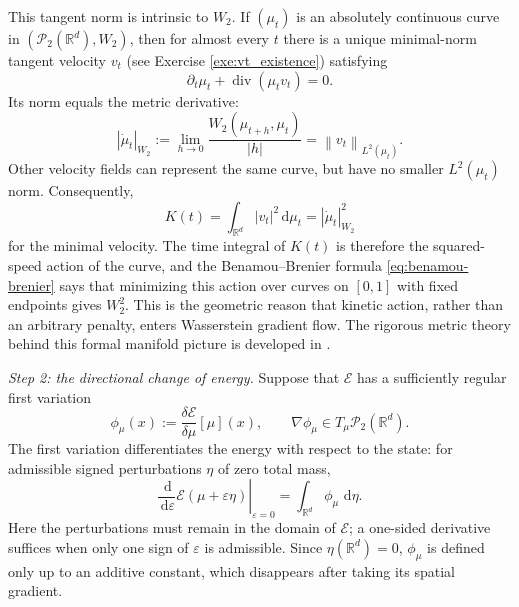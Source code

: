 \documentclass[11pt]{amsart}
\numberwithin{equation}{section}
\theoremstyle{plain}
\newcommand{\R}{\mathbb{R}}
\newcommand{\cP}{\mathcal{P}}
\newcommand{\dd}{\,\mathrm{d}}
\newcommand{\abs}[1]{\left\lvert#1\right\rvert}
\newcommand{\norm}[1]{\left\lVert#1\right\rVert}
\DeclareMathOperator{\diver}{div}
\begin{document}
This tangent norm is intrinsic to $W_2$.  If $(\mu_t)$ is an absolutely
continuous curve in $(\cP_2(\R^d),W_2)$, then for almost every $t$ there is
a unique minimal-norm tangent velocity $v_t$ (see Exercise \ref{exe:vt_existence}) satisfying
\[
 \partial_t\mu_t+\diver(\mu_t v_t)=0.
\]
Its norm equals the metric derivative:
\begin{equation}\label{eq:w2-metric-speed}
 \abs{\dot\mu_t}_{W_2}
 :=\lim_{h\to0}\frac{W_2(\mu_{t+h},\mu_t)}{\abs h}
 =\norm{v_t}_{L^2(\mu_t)}.
\end{equation}
Other velocity fields can represent the same curve, but have no smaller
$L^2(\mu_t)$ norm.  Consequently,
\[
 K(t)=\int_{\R^d}\abs{v_t}^2\dd\mu_t
 =\abs{\dot\mu_t}_{W_2}^2
\]
for the minimal velocity.  The time integral of $K(t)$ is therefore the
squared-speed action of the curve, and the Benamou--Brenier formula
\eqref{eq:benamou-brenier} says that minimizing this action over curves on
$[0,1]$ with fixed endpoints gives $W_2^2$.  This is the geometric reason that kinetic
action, rather than an arbitrary penalty, enters Wasserstein gradient flow.
The rigorous metric theory behind this formal manifold picture is developed
in \cite[Chapters~8, 10--11]{AmbrosioGigliSavare2008}.

\emph{Step 2: the directional change of energy.}
Suppose that $\mathcal E$ has a sufficiently regular first variation
\[
 \phi_\mu(x):=\frac{\delta\mathcal E}{\delta\mu}[\mu](x),
 \qquad
 \nabla\phi_\mu\in T_\mu\cP_2(\R^d).
\]
The first variation differentiates the energy with respect to the state:
for admissible signed perturbations $\eta$ of zero total mass,
\[
 \left.\frac{\dd}{\dd\varepsilon}\mathcal E(\mu+\varepsilon\eta)
 \right|_{\varepsilon=0}
 =\int_{\R^d}\phi_\mu\,\dd\eta.
\]
Here the perturbations must remain in the domain of $\mathcal E$; a
one-sided derivative suffices when only one sign of $\varepsilon$ is
admissible.  Since $\eta(\R^d)=0$, $\phi_\mu$ is defined only up to an
additive constant, which disappears after taking its spatial gradient.
\end{document}
